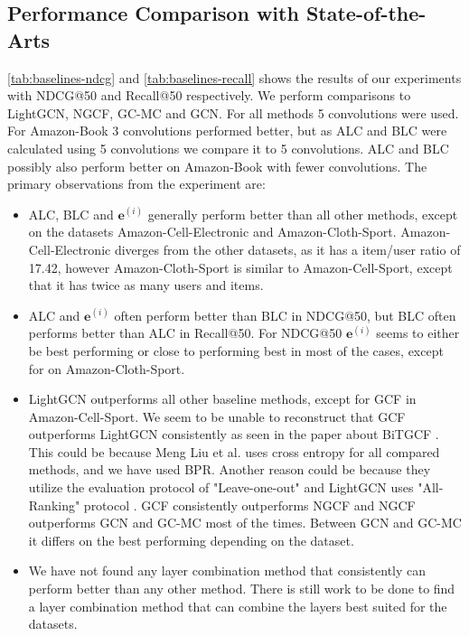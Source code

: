 \subsection{Performance Comparison with State-of-the-Arts}
\autoref{tab:baselines-ndcg} and \autoref{tab:baselines-recall} shows the results of our experiments with NDCG@50 and Recall@50 respectively.
We perform comparisons to LightGCN, NGCF, GC-MC and GCN.
For all methods 5 convolutions were used. For Amazon-Book 3 convolutions performed better, but as ALC and BLC were calculated using 5 convolutions we compare it to 5 convolutions.
ALC and BLC possibly also perform better on Amazon-Book with fewer convolutions.
The primary observations from the experiment are:
\begin{itemize}
    \item ALC, BLC and $\mathbf{e}^{(i)}$ generally perform better than all other methods, except on the datasets Amazon-Cell-Electronic and Amazon-Cloth-Sport. Amazon-Cell-Electronic diverges from the other datasets, as it has a item/user ratio of 17.42, however Amazon-Cloth-Sport is similar to Amazon-Cell-Sport, except that it has twice as many users and items.
    \item ALC and $\mathbf{e}^{(i)}$ often perform better than BLC in NDCG@50, but BLC often performs better than ALC in Recall@50. For NDCG@50 $\mathbf{e}^{(i)}$ seems to either be best performing or close to performing best in most of the cases, except for on Amazon-Cloth-Sport.
    \item LightGCN outperforms all other baseline methods, except for GCF in Amazon-Cell-Sport. We seem to be unable to reconstruct that GCF outperforms LightGCN consistently as seen in the paper about BiTGCF \cite{BiTGCF}. This could be because Meng Liu et al. uses cross entropy for all compared methods, and we have used BPR. Another reason could be because they utilize the evaluation protocol of "Leave-one-out" and LightGCN uses "All-Ranking" protocol \cite{BiTGCF,lightgcn}. GCF consistently outperforms NGCF and NGCF outperforms GCN and GC-MC most of the times. Between GCN and GC-MC it differs on the best performing depending on the dataset.
    \item We have not found any layer combination method that consistently can perform better than any other method. There is still work to be done to find a layer combination method that can combine the layers best suited for the datasets.
\end{itemize}
